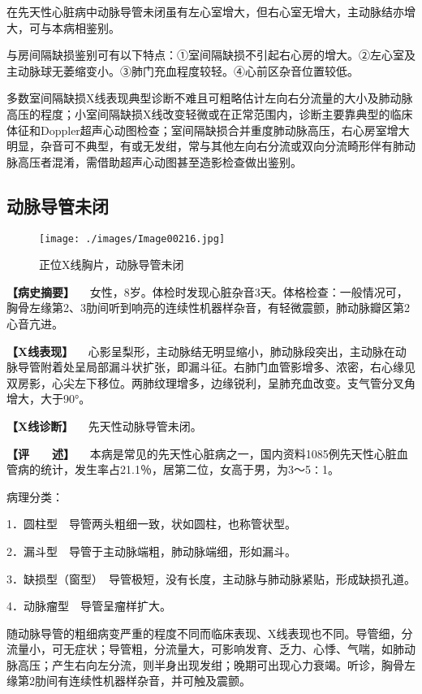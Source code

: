 在先天性心脏病中动脉导管未闭虽有左心室增大，但右心室无增大，主动脉结亦增大，可与本病相鉴别。

与房间隔缺损鉴别可有以下特点：①室间隔缺损不引起右心房的增大。②左心室及主动脉球无萎缩变小。③肺门充血程度较轻。④心前区杂音位置较低。

多数室间隔缺损X线表现典型诊断不难且可粗略估计左向右分流量的大小及肺动脉高压的程度；小室间隔缺损X线改变轻微或在正常范围内，诊断主要靠典型的临床体征和Doppler超声心动图检查；室间隔缺损合并重度肺动脉高压，右心房室增大明显，杂音可不典型，有或无发绀，常与其他左向右分流或双向分流畸形伴有肺动脉高压者混淆，需借助超声心动图甚至造影检查做出鉴别。

\subsection{动脉导管未闭}

\begin{figure}[!htbp]
 \centering
 \texttt{[image: ./images/Image00216.jpg]}
 \captionsetup{justification=centering}
 \caption{正位X线胸片，动脉导管未闭}
 \label{fig4-2-3}
  \end{figure} 

\textbf{【病史摘要】}
　女性，8岁。体检时发现心脏杂音3天。体格检查：一般情况可，胸骨左缘第2、3肋间听到响亮的连续性机器样杂音，有轻微震颤，肺动脉瓣区第2心音亢进。

\textbf{【X线表现】}
　心影呈梨形，主动脉结无明显缩小，肺动脉段突出，主动脉在动脉导管附着处呈局部漏斗状扩张，即漏斗征。右肺门血管影增多、浓密，右心缘见双房影，心尖左下移位。两肺纹理增多，边缘锐利，呈肺充血改变。支气管分叉角增大，大于90°。

\textbf{【X线诊断】} 　先天性动脉导管未闭。

\textbf{【评　　述】}
　本病是常见的先天性心脏病之一，国内资料1085例先天性心脏血管病的统计，发生率占21.1％，居第二位，女高于男，为3～5∶1。

病理分类：

1．圆柱型　导管两头粗细一致，状如圆柱，也称管状型。

2．漏斗型　导管于主动脉端粗，肺动脉端细，形如漏斗。

3．缺损型（窗型）　导管极短，没有长度，主动脉与肺动脉紧贴，形成缺损孔道。

4．动脉瘤型　导管呈瘤样扩大。

随动脉导管的粗细病变严重的程度不同而临床表现、X线表现也不同。导管细，分流量小，可无症状；导管粗，分流量大，可影响发育、乏力、心悸、气喘，如肺动脉高压；产生右向左分流，则半身出现发绀；晚期可出现心力衰竭。听诊，胸骨左缘第2肋间有连续性机器样杂音，并可触及震颤。


